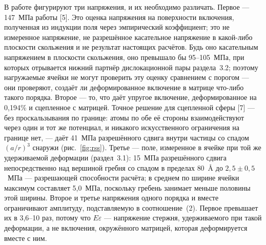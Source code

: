 В работе фигурируют три напряжения, и их необходимо различать. Первое ---
147~МПа работы [5]. Это оценка напряжения на поверхности включения,
полученная из индукции поля через эмпирический коэффициент; это не
измеренное напряжение, не разрешённое касательное напряжение в какой-либо
плоскости скольжения и не результат настоящих расчётов. Будь оно касательным
напряжением в плоскости скольжения, оно превышало бы 95--105~МПа,
при которых отрывается нижний партнёр дислокационной пары раздела~3.2;
поэтому нагружаемые ячейки не могут проверить эту оценку сравнением с
порогом --- они проверяют, создаёт ли деформированное включение в матрице
что-либо такого порядка.
Второе --- то, что даёт упругое включение, деформированное на 0{,}194\% и
сцепленное с матрицей. Точное решение для сцепленной сферы [7] --- без
проскальзывания по границе: атомы по обе её стороны взаимодействуют через
один и тот же потенциал, и никакого искусственного ограничения на границе
нет, --- даёт 41~МПа разрешённого сдвига внутри частицы со спадом
$(a/r)^{3}$ снаружи (рис.~\ref{fig:rss}). Третье --- поле, измеренное в
ячейке при той же удерживаемой деформации (раздел~3.1):
15~МПа разрешённого сдвига непосредственно над вершиной гребня
со спадом в пределах 80~\AA{} до $2{,}5\pm0{,}5$~МПа --- разрешающей
способности расчёта; в
среднем по ширине ячейки максимум составляет 5{,}0~МПа,
поскольку гребень занимает меньше половины этой ширины. Второе и третье
напряжения одного порядка и вместе ограничивают амплитуду, подставляемую в
соотношение~(2). Первое превышает их в 3{,}6--10 раз, потому что
$E\varepsilon$ --- напряжение стержня, удерживаемого при такой деформации, а
не включения, окружённого матрицей, которая деформируется вместе с ним.

